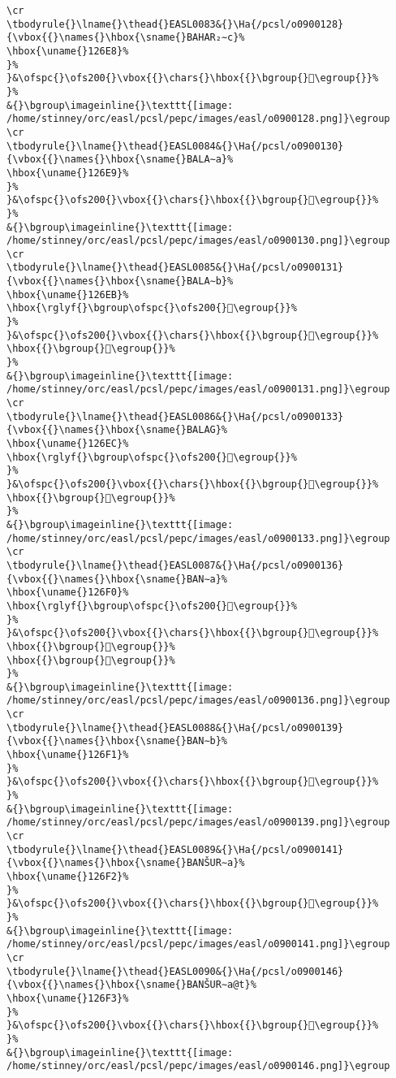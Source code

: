 \begin{verbatim}
\cr
\tbodyrule{}\lname{}\thead{}EASL0083&{}\Ha{/pcsl/o0900128}{\vbox{{}\names{}\hbox{\sname{}BAHAR₂∼c}%
\hbox{\uname{}126E8}%
}%
}&\ofspc{}\ofs200{}\vbox{{}\chars{}\hbox{{}\bgroup{}𒛨\egroup{}}%
}%
&{}\bgroup\imageinline{}\texttt{[image: /home/stinney/orc/easl/pcsl/pepc/images/easl/o0900128.png]}\egroup
\cr
\tbodyrule{}\lname{}\thead{}EASL0084&{}\Ha{/pcsl/o0900130}{\vbox{{}\names{}\hbox{\sname{}BALA∼a}%
\hbox{\uname{}126E9}%
}%
}&\ofspc{}\ofs200{}\vbox{{}\chars{}\hbox{{}\bgroup{}𒛩\egroup{}}%
}%
&{}\bgroup\imageinline{}\texttt{[image: /home/stinney/orc/easl/pcsl/pepc/images/easl/o0900130.png]}\egroup
\cr
\tbodyrule{}\lname{}\thead{}EASL0085&{}\Ha{/pcsl/o0900131}{\vbox{{}\names{}\hbox{\sname{}BALA∼b}%
\hbox{\uname{}126EB}%
\hbox{\rglyf{}\bgroup\ofspc{}\ofs200{}𒛫\egroup{}}%
}%
}&\ofspc{}\ofs200{}\vbox{{}\chars{}\hbox{{}\bgroup{}𒛪\egroup{}}%
\hbox{{}\bgroup{}𒛫\egroup{}}%
}%
&{}\bgroup\imageinline{}\texttt{[image: /home/stinney/orc/easl/pcsl/pepc/images/easl/o0900131.png]}\egroup
\cr
\tbodyrule{}\lname{}\thead{}EASL0086&{}\Ha{/pcsl/o0900133}{\vbox{{}\names{}\hbox{\sname{}BALAG}%
\hbox{\uname{}126EC}%
\hbox{\rglyf{}\bgroup\ofspc{}\ofs200{}𒛬\egroup{}}%
}%
}&\ofspc{}\ofs200{}\vbox{{}\chars{}\hbox{{}\bgroup{}𒛬\egroup{}}%
\hbox{{}\bgroup{}𒛭\egroup{}}%
}%
&{}\bgroup\imageinline{}\texttt{[image: /home/stinney/orc/easl/pcsl/pepc/images/easl/o0900133.png]}\egroup
\cr
\tbodyrule{}\lname{}\thead{}EASL0087&{}\Ha{/pcsl/o0900136}{\vbox{{}\names{}\hbox{\sname{}BAN∼a}%
\hbox{\uname{}126F0}%
\hbox{\rglyf{}\bgroup\ofspc{}\ofs200{}𒛰\egroup{}}%
}%
}&\ofspc{}\ofs200{}\vbox{{}\chars{}\hbox{{}\bgroup{}𒛮\egroup{}}%
\hbox{{}\bgroup{}𒛯\egroup{}}%
\hbox{{}\bgroup{}𒛰\egroup{}}%
}%
&{}\bgroup\imageinline{}\texttt{[image: /home/stinney/orc/easl/pcsl/pepc/images/easl/o0900136.png]}\egroup
\cr
\tbodyrule{}\lname{}\thead{}EASL0088&{}\Ha{/pcsl/o0900139}{\vbox{{}\names{}\hbox{\sname{}BAN∼b}%
\hbox{\uname{}126F1}%
}%
}&\ofspc{}\ofs200{}\vbox{{}\chars{}\hbox{{}\bgroup{}𒛱\egroup{}}%
}%
&{}\bgroup\imageinline{}\texttt{[image: /home/stinney/orc/easl/pcsl/pepc/images/easl/o0900139.png]}\egroup
\cr
\tbodyrule{}\lname{}\thead{}EASL0089&{}\Ha{/pcsl/o0900141}{\vbox{{}\names{}\hbox{\sname{}BANŠUR∼a}%
\hbox{\uname{}126F2}%
}%
}&\ofspc{}\ofs200{}\vbox{{}\chars{}\hbox{{}\bgroup{}𒛲\egroup{}}%
}%
&{}\bgroup\imageinline{}\texttt{[image: /home/stinney/orc/easl/pcsl/pepc/images/easl/o0900141.png]}\egroup
\cr
\tbodyrule{}\lname{}\thead{}EASL0090&{}\Ha{/pcsl/o0900146}{\vbox{{}\names{}\hbox{\sname{}BANŠUR∼a@t}%
\hbox{\uname{}126F3}%
}%
}&\ofspc{}\ofs200{}\vbox{{}\chars{}\hbox{{}\bgroup{}𒛳\egroup{}}%
}%
&{}\bgroup\imageinline{}\texttt{[image: /home/stinney/orc/easl/pcsl/pepc/images/easl/o0900146.png]}\egroup

\end{verbatim}

